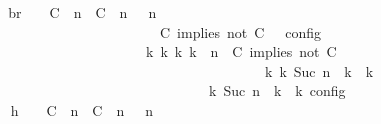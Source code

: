 \begin{isabellebody}
\ \ \ \ \ \ \isamarkupfalse%
\ \isamarkupfalse%
\ br{}{\isacharcolon}\ {\isacartoucheopen}{\isasymrho}\ {\isasymin}\ {\isasymlbrakk}\ {\isacharparenleft}{\isacharparenleft}C\ {\isasymUp}\ n{\isacharparenright}\ {\isacharhash}\ {\isacharparenleft}C\ {\isasymnot}{\isasymUp}\ n{\isacharparenright}\ {\isacharhash}\ {\isasymGamma}{\isacharparenright}{\isacharcomma}\ n\isanewline
\ \ \ \ \ \ \ \ \ \ \ \ \ \ \ \ \ \ \ \ \ \ \ \ \ \ \ \ {\isasymturnstile}\ {\isasymPsi}\ {\isasymtriangleright}\ {\isacharparenleft}{\isacharparenleft}C\ implies\ not\ C\ {\isacharhash}\ {\isasymPhi}{\isacharparenright}\ {\isasymrbrakk}\isactrlsub c\isactrlsub o\isactrlsub n\isactrlsub f\isactrlsub i\isactrlsub g\isanewline
\ \ \ \ \ \ \ \ \ \ \ \ \ \ \ \ \ \ \ \ \ \ \ \ \ \ \ \ {\isasymLongrightarrow}\ {\isasymexists}{\isasymGamma}\isactrlsub k\ {\isasymPsi}\isactrlsub k\ {\isasymPhi}\isactrlsub k\ k{\isachardot}\ {\isacharparenleft}{\isacharparenleft}{\isasymGamma}{\isacharcomma}\ n\ {\isasymturnstile}\ {\isacharparenleft}{\isacharparenleft}C\ implies\ not\ C\ {\isacharhash}\ {\isasymPsi}{\isacharparenright}\ {\isasymtriangleright}\ {\isasymPhi}{\isacharparenright}\isanewline
\ \ \ \ \ \ \ \ \ \ \ \ \ \ \ \ \ \ \ \ \ \ \ \ \ \ \ \ \ \ \ \ \ \ \ \ \ \ \ \ \ \ \ \ \ \ {\isasymhookrightarrow}\isactrlbsup k\isactrlesup \ {\isacharparenleft}{\isasymGamma}\isactrlsub k{\isacharcomma}\ Suc\ n\ {\isasymturnstile}\ {\isasymPsi}\isactrlsub k\ {\isasymtriangleright}\ {\isasymPhi}\isactrlsub k{\isacharparenright}{\isacharparenright}\isanewline
\ \ \ \ \ \ \ \ \ \ \ \ \ \ \ \ \ \ \ \ \ \ \ \ \ \ \ \ \ \ \ \ \ \ {\isasymand}\ {\isasymrho}\ {\isasymin}\ {\isasymlbrakk}\ {\isasymGamma}\isactrlsub k{\isacharcomma}\ Suc\ n\ {\isasymturnstile}\ {\isasymPsi}\isactrlsub k\ {\isasymtriangleright}\ {\isasymPhi}\isactrlsub k\ {\isasymrbrakk}\isactrlsub c\isactrlsub o\isactrlsub n\isactrlsub f\isactrlsub i\isactrlsub g{\isacartoucheclose}\isanewline
\ \ \ \ \ \ \isamarkupfalse%
\ {\isacharminus}\isanewline
\ \ \ \ \ \ \ \ \isamarkupfalse%
\ h{}{\isacharcolon}\ {\isacartoucheopen}{\isasymrho}\ {\isasymin}\ {\isasymlbrakk}\ {\isacharparenleft}{\isacharparenleft}C\ {\isasymUp}\ n{\isacharparenright}\ {\isacharhash}\ {\isacharparenleft}C\ {\isasymnot}{\isasymUp}\ n{\isacharparenright}\ {\isacharhash}\ {\isasymGamma}{\isacharparenright}{\isacharcomma}\ n\isanewline

\end{isabellebody}
